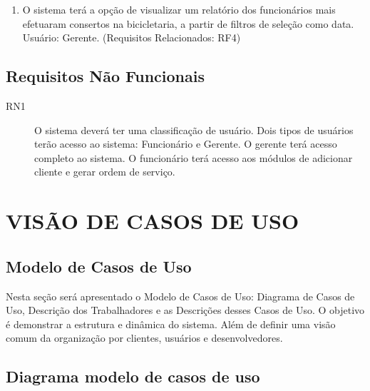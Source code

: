 \documentclass[
	12pt,				%
	openright,
	oneside,			%
	a4paper,			%
	chapter=TITLE,		%
	brazil				%
	]{abntex2}
\begin{document}
\begin{enumerate}[label=\bfseries RF\arabic*]
	
	\item O sistema terá a opção de visualizar um relatório dos funcionários mais efetuaram consertos na bicicletaria, a partir de filtros de seleção como data.  
\\Usuário: Gerente. (Requisitos Relacionados: RF4) 



\end{enumerate}

\section{Requisitos Não Funcionais}

\begin{description}
	\item[RN1] O sistema deverá ter uma classificação de usuário. Dois tipos de usuários terão acesso ao sistema: Funcionário e Gerente. O gerente terá acesso completo ao sistema. O funcionário terá acesso aos módulos de adicionar cliente e gerar ordem de serviço. 
	
	
	
\end{description}


\newpage
\chapter{VISÃO DE CASOS DE USO}

\section{Modelo de Casos de Uso}

Nesta seção será apresentado o Modelo de Casos de Uso: Diagrama de Casos de Uso, Descrição dos Trabalhadores e as Descrições desses Casos de Uso. O objetivo é demonstrar a estrutura e dinâmica do sistema. Além de definir uma visão comum da organização por  clientes, usuários e desenvolvedores.

\section{Diagrama modelo de casos de uso}
\end{document}
